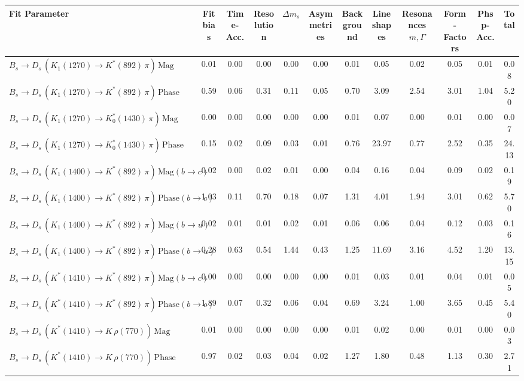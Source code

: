 \begin{tabular}{l  c  c  c  c  c  c  c  c  c  c  | c }
\hline
\hline
Fit Parameter & Fit bias & Time-Acc. & Resolution & $\Delta m_{s}$ & Asymmetries & Background & Lineshapes & Resonances $m,\Gamma$ & Form-Factors & Phsp-Acc. &  Total  \\ 
\hline
$B_s \to D_s \, ( K_1(1270) \to K^{*}(892) \, \pi ) \, \text{Mag}$ & 0.01 & 0.00 & 0.00 & 0.00 & 0.00 & 0.01 & 0.05 & 0.02 & 0.05 & 0.01 & 0.08 \\ 
$B_s \to D_s \, ( K_1(1270) \to K^{*}(892) \, \pi ) \, \text{Phase}$ & 0.59 & 0.06 & 0.31 & 0.11 & 0.05 & 0.70 & 3.09 & 2.54 & 3.01 & 1.04 & 5.20 \\ 
$B_s \to D_s \, ( K_1(1270) \to K^{*}_{0}(1430) \, \pi ) \, \text{Mag} $ & 0.00 & 0.00 & 0.00 & 0.00 & 0.00 & 0.01 & 0.07 & 0.00 & 0.01 & 0.00 & 0.07 \\ 
$B_s \to D_s \, ( K_1(1270) \to K^{*}_{0}(1430) \, \pi ) \, \text{Phase} $ & 0.15 & 0.02 & 0.09 & 0.03 & 0.01 & 0.76 & 23.97 & 0.77 & 2.52 & 0.35 & 24.13 \\ 
$B_s \to D_s \, ( K_1(1400) \to K^{*}(892) \, \pi ) \, \text{Mag} (b \to c)$ & 0.02 & 0.00 & 0.02 & 0.01 & 0.00 & 0.04 & 0.16 & 0.04 & 0.09 & 0.02 & 0.19 \\ 
$B_s \to D_s \, ( K_1(1400) \to K^{*}(892) \, \pi ) \, \text{Phase} (b \to c)$ & 1.03 & 0.11 & 0.70 & 0.18 & 0.07 & 1.31 & 4.01 & 1.94 & 3.01 & 0.62 & 5.70 \\ 
$B_s \to D_s \, ( K_1(1400) \to K^{*}(892) \, \pi ) \, \text{Mag} (b \to u)$ & 0.02 & 0.01 & 0.01 & 0.02 & 0.01 & 0.06 & 0.06 & 0.04 & 0.12 & 0.03 & 0.16 \\ 
$B_s \to D_s \, ( K_1(1400) \to K^{*}(892) \, \pi ) \, \text{Phase} (b \to u)$ & 0.28 & 0.63 & 0.54 & 1.44 & 0.43 & 1.25 & 11.69 & 3.16 & 4.52 & 1.20 & 13.15 \\ 
$B_s \to D_s \, ( K^{*}(1410) \to K^{*}(892) \, \pi ) \, \text{Mag} (b \to c)$ & 0.00 & 0.00 & 0.00 & 0.00 & 0.00 & 0.01 & 0.03 & 0.01 & 0.04 & 0.01 & 0.05 \\ 
$B_s \to D_s \, ( K^{*}(1410) \to K^{*}(892) \, \pi ) \, \text{Phase} (b \to c)$ & 1.89 & 0.07 & 0.32 & 0.06 & 0.04 & 0.69 & 3.24 & 1.00 & 3.65 & 0.45 & 5.40 \\ 
$B_s \to D_s \, ( K^{*}(1410) \to K \, \rho(770) ) \, \text{Mag}$ & 0.01 & 0.00 & 0.00 & 0.00 & 0.00 & 0.01 & 0.02 & 0.00 & 0.01 & 0.00 & 0.03 \\ 
$B_s \to D_s \, ( K^{*}(1410) \to K \, \rho(770) ) \, \text{Phase}$ & 0.97 & 0.02 & 0.03 & 0.04 & 0.02 & 1.27 & 1.80 & 0.48 & 1.13 & 0.30 & 2.71 \\ 

\end{tabular}
